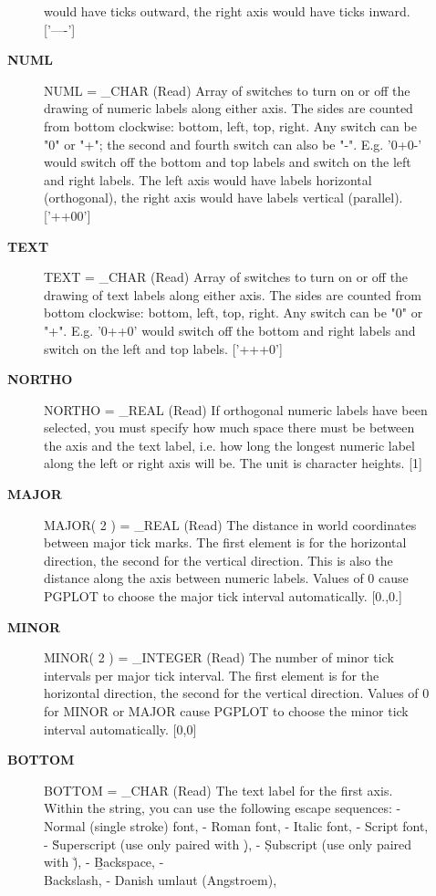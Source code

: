 \begin{description}
\begin{description}
   would have ticks outward, the right axis would have ticks
   inward. ['----']
\item [{\bf NUML}]
NUML = _CHAR (Read)
   Array of switches to turn on or off the drawing of numeric
   labels along either axis. The sides are counted from bottom
   clockwise: bottom, left, top, right. Any switch can be
   "0" or "+"; the second and fourth switch can also be "-". E.g.
   '0+0-' would switch off the bottom and top labels and switch
   on the left and right labels. The left axis would have labels
   horizontal (orthogonal), the right axis would have labels
   vertical (parallel). ['++00']
\item [{\bf TEXT}]
TEXT = _CHAR (Read)
   Array of switches to turn on or off the drawing of text labels
   along either axis. The sides are counted from bottom
   clockwise: bottom, left, top, right. Any switch can be
   "0" or "+". E.g. '0++0' would switch off the bottom and right
   labels and switch on the left and top labels. ['+++0']
\item [{\bf NORTHO}]
NORTHO = _REAL (Read)
   If orthogonal numeric labels have been selected, you must
   specify how much space there must be between the
   axis and the text label, i.e. how long the longest numeric
   label along the left or right axis will be. The unit is character
   heights. [1]
\item [{\bf MAJOR}]
MAJOR( 2 ) = _REAL (Read)
   The distance in world coordinates between major tick marks. The
   first element is for the horizontal direction, the second for
   the vertical direction. This is also the distance along the
   axis between numeric labels. Values of 0 cause PGPLOT to choose
   the major tick interval automatically. [0.,0.]
\item [{\bf MINOR}]
MINOR( 2 ) = _INTEGER (Read)
   The number of minor tick intervals per major tick interval. The
   first element is for the horizontal direction, the second for
   the vertical direction. Values of 0 for MINOR or MAJOR cause
   PGPLOT to choose the minor tick interval automatically. [0,0]
\item [{\bf BOTTOM}]
BOTTOM = _CHAR (Read)
   The text label for the first axis. Within the string, you can
   use the following escape sequences:
   - \fn Normal (single stroke) font,
   - \fr Roman font,
   - \fi Italic font,
   - \fs Script font,
   - \u  Superscript (use only paired with \d),
   - \d  Subscript (use only paired with \u),
   - \b  Backspace,
   - \\  Backslash,
   - \A  Danish umlaut (Angstroem),

\end{description}
\end{description}
